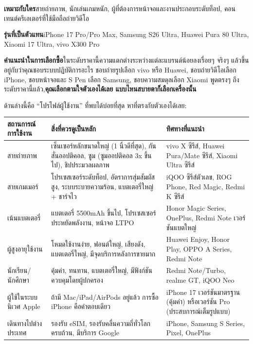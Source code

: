
\textbf{เหมาะกับใคร}สายถ่ายภาพ, นักเล่นเกมหนัก, ผู้ที่ต้องการหน้าจอและงานประกอบระดับท็อป, คอนเทนต์ครีเอเตอร์ที่ใช้มือถือถ่ายวิดีโอ

\textbf{รุ่นที่เป็นตัวแทน}iPhone 17 Pro/Pro Max, Samsung S26 Ultra, Huawei Pura 80 Ultra, Xiaomi 17 Ultra, vivo X300 Pro

\textbf{คำแนะนำในการเลือกซื้อ}ในระดับราคานี้ความแตกต่างระหว่างแต่ละแบรนด์น้อยลงเรื่อยๆ จริงๆ แล้วขึ้นอยู่กับว่าคุณชอบระบบปฏิบัติการอะไร ชอบถ่ายรูปเลือก vivo หรือ Huawei, ชอบถ่ายวิดีโอเลือก iPhone, ชอบหน้าจอและ S Pen เลือก Samsung, ชอบความสมดุลเลือก Xiaomi พูดตรงๆ ถึงระดับราคานี้แล้ว,\textbf{คุณเลือกตามใจตัวเองได้เลย แบบไหนสบายตาก็เลือกเครื่องนั้น}


ด้านล่างนี้คือ “โปรไฟล์ผู้ใช้งาน” ที่พบได้บ่อยที่สุด หาที่ตรงกับตัวเองได้เลย:

\begin{center}
\begin{tabularx}{\linewidth}{|X|X|X|}
\hline
\textbf{สถานการณ์การใช้งาน} & \textbf{สิ่งที่ควรดูเป็นหลัก} & \textbf{ทิศทางที่แนะนำ} \tabularnewline
\hline
สายถ่ายภาพ & เซ็นเซอร์หลักขนาดใหญ่ (1 นิ้วดีที่สุด), กันสั่นออปติคอล, ซูม (ซูมออปติคอล 3x ขึ้นไป), ชิปประมวลผลภาพ & vivo X ซีรีส์, Huawei Pura/Mate ซีรีส์, Xiaomi Ultra ซีรีส์ \tabularnewline
สายเกมเมอร์ & โปรเซสเซอร์ระดับท็อป, อัตราการสุ่มสัมผัสสูง, ระบบระบายความร้อน, แบตเตอรี่ใหญ่ + ชาร์จไว & iQOO ซีรีส์ตัวเลข, ROG Phone, Red Magic, Redmi K ซีรีส์ \tabularnewline
เน้นแบตเตอรี่ & แบตเตอรี่ 5500mAh ขึ้นไป, โปรเซสเซอร์ประหยัดพลังงาน, หน้าจอ LTPO & Honor Magic Series, OnePlus, Redmi Note เวอร์ชันแบตใหญ่ \tabularnewline
ผู้สูงอายุใช้งาน & โหมดใช้งานง่าย, ฟอนต์ใหญ่, เสียงดัง, แบตเตอรี่ใหญ่, มีจุดบริการหลังการขายมาก & Huawei Enjoy, Honor Play, OPPO A Series, Redmi Note \tabularnewline
นักเรียน/นักศึกษา & คุ้มค่า, ทนทาน, แบตเตอรี่ใหญ่, มีฟังก์ชันควบคุมโดยผู้ปกครอง & Redmi Note/Turbo, realme GT, iQOO Neo \tabularnewline
ผู้ใช้ในระบบนิเวศ Apple & ถ้ามี Mac/iPad/AirPods อยู่แล้ว การซื้อ iPhone คือคำตอบเดียว & iPhone 17 เวอร์ชันมาตรฐาน (คุ้มค่า) หรือเวอร์ชัน Pro (ประสบการณ์เต็มรูปแบบ) \tabularnewline
เดินทางไปต่างประเทศ & รองรับ eSIM, รองรับคลื่นความถี่ทั่วโลกครบถ้วน, มีบริการ Google & iPhone, Samsung S Series, Pixel, OnePlus \tabularnewline
\hline
\end{tabularx}
\end{center}

